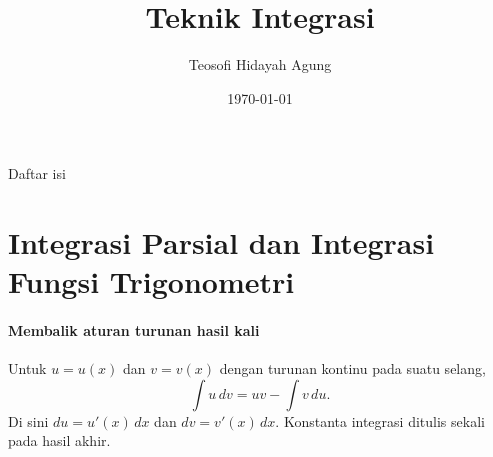 \documentclass{../../kalkulus-ppt}
\author[Tetew]{Teosofi Hidayah Agung}
\date{\today}
\title[Kalkulus 2 - Bab 2]{Teknik Integrasi}
\institute[Matematika ITS]{Departemen Matematika\\ Institut Teknologi Sepuluh Nopember}
\begin{document}
\begin{frame}
    \titlepage
\end{frame}

\begin{frame}{Daftar isi}
    \tableofcontents
\end{frame}

\section[Integrasi Parsial dan Trigonometri]{Integrasi Parsial dan Integrasi Fungsi Trigonometri}

\begin{frame}{\insertsection}
    \framesubtitle{Membalik aturan turunan hasil kali}
    \begin{teorema}
        Untuk $u=u(x)$ dan $v=v(x)$ dengan turunan kontinu pada suatu selang,
        \[
            \int u\,dv=uv-\int v\,du.
        \]
        Di sini $du=u'(x)\,dx$ dan $dv=v'(x)\,dx$.
        Konstanta integrasi ditulis sekali pada hasil akhir.
    \end{teorema}
\end{frame}
\end{document}
